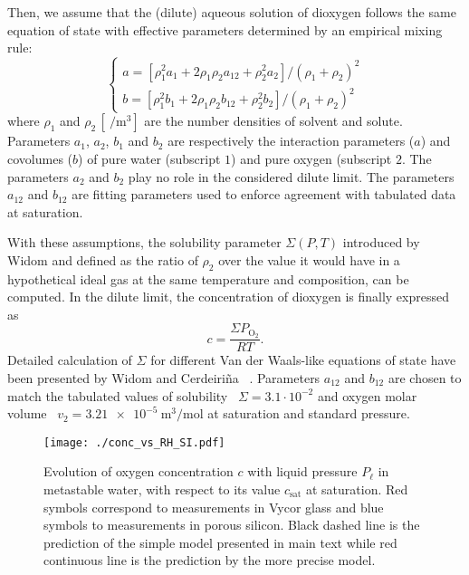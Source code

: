 \documentclass[aps,prl,twocolumn,superscriptaddress,groupedaddress]{revtex4}
\begin{document}
Then, we assume that the (dilute) aqueous solution of dioxygen follows the same equation of state with effective parameters determined by an empirical mixing rule:~\cite{vankonynenburg_1980}
\begin{equation}
\left\{ \begin{array}{l}
a = [\rho_1^2 a_1 + 2 \rho_1 \rho_2 a_{12} + \rho_2^2 a_2] / (\rho_1+\rho_2)^2 \\
b = [\rho_1^2 b_1 + 2 \rho_1 \rho_2 b_{12} + \rho_2^2 b_2] / (\rho_1+\rho_2)^2
\end{array} \right. 
\end{equation}
\noindent where $\rho_1$ and $\rho_2 \, [\SI{}{\per\meter\cubed}]$ are the number densities of solvent and solute. Parameters $a_1$, $a_2$, $b_1$ and $b_2$ are respectively the interaction parameters ($a$) and covolumes ($b$) of pure water (subscript $1$) and pure oxygen (subscript $2$. The parameters $a_2$ and $b_2$ play no role in the considered dilute limit.  The parameters $a_{12}$ and $b_{12}$ are fitting parameters used to enforce agreement with tabulated data at saturation.

With these assumptions, the solubility parameter $\Sigma(P,T)$ introduced by Widom and defined as the ratio of $\rho_2$ over the value it would have in a hypothetical ideal gas at the same temperature and composition, can be computed. In the dilute limit, the concentration of dioxygen is finally expressed as
\begin{equation}
c = \frac{\Sigma P_\mathrm{O_2}}{RT}.
\end{equation}
\noindent Detailed calculation of $\Sigma$ for different Van der Waals-like equations of state have been presented by Widom and Cerdeiri{\~n}a ~\cite{cerdeirina_2016}. Parameters $a_{12}$ and $b_{12}$ are chosen to match the tabulated values of solubility~\cite{handbook} $\Sigma=3.1 \cdot 10^{-2}$ and oxygen molar volume~\cite{taylor_1978,zhou_2001} $v_2=\SI{3.21e-5}{\meter\cubed\per\mole}$ at saturation and standard pressure.

\begin{figure}[!htb]
\centering
\texttt{[image: ./conc\_vs\_RH\_SI.pdf]}
\caption{Evolution of oxygen concentration $c$ with liquid pressure $P_\ell$ in metastable water, with respect to its value $c_\text{sat}$ at saturation. Red symbols correspond to measurements in Vycor glass and blue symbols to measurements in porous silicon. Black dashed line is the prediction of the simple model presented in main text while red continuous line is the prediction by the more precise model. \label{fig:conc_vs_RH}}
\end{figure}
\end{document}
